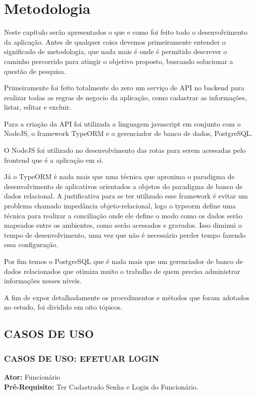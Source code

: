 \chapter{Metodologia}
Neste capítulo serão apresentados o que e como foi feito todo o desenvolvimento da aplicação. Antes de qualquer coisa devemos primeiramente entender o significado de metodologia, que nada mais é onde é permitido descrever o caminho percorrido para atingir o objetivo proposto, buscando solucionar a questão de pesquisa.

Primeiramente foi feito totalmente do zero um serviço de API no backend para realizar todas as regras de negocio da aplicação, como cadastrar as informações, listar, editar e excluir. 

Para a criação da API foi utilizada a linguagem javascript em conjunto com o NodeJS, o framework TypeORM e o gerenciador de banco de dados, PostgreSQL.

O NodeJS foi utilizado no desenvolvimento das rotas para serem acessadas pelo frontend que é a aplicação em si.

Já o TypeORM é nada mais que uma técnica que aproxima o paradigma de desenvolvimento de aplicativos orientados a objetos do paradigma de banco de dados relacional. A justificativa para se ter utilizado esse framework é evitar um problema chamado impedância objeto-relacional, logo o typeorm define uma técnica para realizar a conciliação onde ele define o modo como os dados serão mapeados entre os ambientes, como serão acessados e gravados. Isso diminui o tempo de desenvolvimento, uma vez que não é necessário perder tempo fazendo essa configuração.

Por fim temos o PostgreSQL que é nada mais que um gerenciador de banco de dados relacionados que otimiza muito o trabalho de quem precisa administrar informações nesses níveis.

A fim de expor detalhadamente os procedimentos e métodos que foram adotados no
estudo, foi dividido em oito tópicos.

\section{CASOS DE USO}
\subsection{CASOS DE USO: EFETUAR LOGIN}
\begin{flushleft}
\textbf{Ator:}  Funcionário
\\
\textbf{Pré-Requisito:} Ter Cadastrado Senha e Login do Funcionário.
\end{flushleft}


